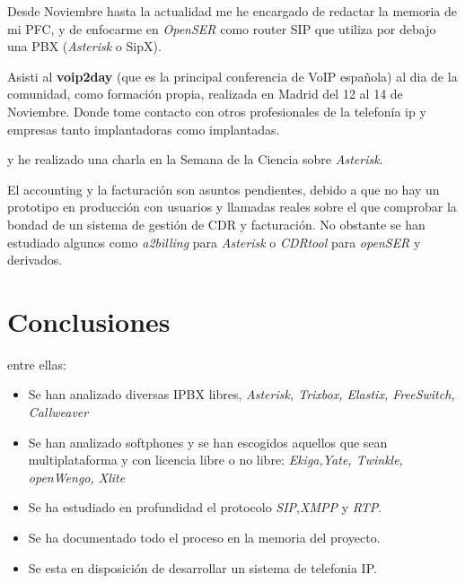 \documentclass{article}
\begin{document}
Desde Noviembre hasta la actualidad me he encargado de redactar la memoria de mi PFC, y de enfocarme en \emph{OpenSER} como router SIP que utiliza por debajo una PBX (\emph{Asterisk} o SipX).

Asisti al \textbf{voip2day} (que es la principal conferencia de VoIP española) al dia de la comunidad, como formación propia, realizada en Madrid del 12 al 14 de Noviembre. Donde tome contacto con otros profesionales de la telefonía ip y empresas tanto implantadoras como implantadas.

y he realizado una charla en la Semana de la Ciencia sobre \emph{Asterisk}. 

El accounting y la facturación son asuntos pendientes, debido a que no hay un prototipo en producción con usuarios y llamadas reales sobre el que comprobar la bondad de un sistema de gestión de CDR y facturación. No obstante se han estudiado algunos como \emph{a2billing} para \emph{Asterisk} o \emph{CDRtool} para \emph{openSER} y derivados.

\section{Conclusiones}
\label{sec:conclusiones}

entre ellas:

\begin{itemize}
\item Se han analizado diversas IPBX libres, \emph{Asterisk, Trixbox, Elastix, FreeSwitch, Callweaver}
\item Se han analizado softphones y se han escogidos aquellos que sean
  multiplataforma y con licencia libre o no libre: \emph{Ekiga,Yate, Twinkle, openWengo, Xlite}
\item Se ha estudiado en profundidad el protocolo \emph{SIP},\emph{XMPP} y \emph{RTP}.
\item Se ha documentado todo el proceso en la memoria del proyecto.
\item Se esta en disposición de desarrollar un sistema de telefonia IP.
\end{itemize}
\end{document}
